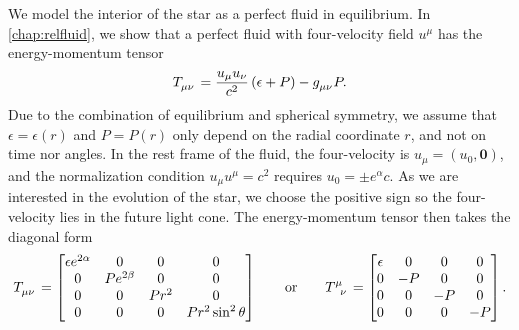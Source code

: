We model the interior of the star as a perfect fluid in equilibrium.
In \cref{chap:relfluid}, we show that a perfect fluid with four-velocity field $u^\mu$ has the energy-momentum tensor
\begin{equation}
	T\indices{_\mu_\nu} = \frac{u_\mu u_\nu}{c^2} \left( \epsilon + P \right)  - g\indices{_\mu_\nu} P .
	\label{eq:tov:energy_momentum_perfect_fluid}
\end{equation}
Due to the combination of equilibrium and spherical symmetry, we assume that $\epsilon = \epsilon(r)$ and $P = P(r)$ only depend on the radial coordinate $r$, and not on time nor angles.
In the rest frame of the fluid, the four-velocity is $u_\mu = (u_0, \textbf{0})$, and the normalization condition $u_\mu u^\mu = c^2$ requires $u_0 = \pm e^\alpha c$.
As we are interested in the evolution of the star, we choose the positive sign so the four-velocity lies in the future light cone.
The energy-momentum tensor then takes the diagonal form
\begin{equation}
T\indices{_\mu_\nu} =
\begin{bmatrix}
	\epsilon e^{2\alpha} & 0            & 0     & 0                   \\
	0                    & P e^{2\beta} & 0     & 0                   \\
	0                    & 0            & P r^2 & 0                   \\
	0                    & 0            & 0     & P r^2 \sin^2 \theta \\
\end{bmatrix}
\qquad \text{or} \qquad
T\indices{^\mu_\nu} =
\begin{bmatrix}
	\epsilon &  0 &  0 &  0 \\
	0        & -P &  0 &  0 \\
	0        &  0 & -P &  0 \\
	0        &  0 &  0 & -P \\
\end{bmatrix}
.
\label{eq:einstein_to_tov:T}
\end{equation}

